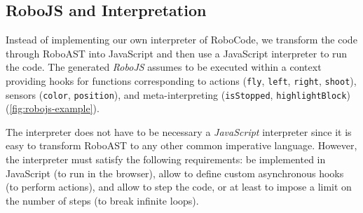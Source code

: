 
\subsection{RoboJS and Interpretation}
\label{sec:robomission-robojs}

Instead of implementing our own interpreter of RoboCode,
we transform the code through RoboAST into JavaScript
and then use a JavaScript interpreter to run the code.
The generated \emph{RoboJS} %
assumes to be executed within a
context providing hooks for functions corresponding to actions (\texttt{fly}, \texttt{left}, \texttt{right}, \texttt{shoot}),
sensors (\texttt{color}, \texttt{position}),
and meta-interpreting (\texttt{isStopped}, \texttt{highlightBlock})
(\cref{fig:robojs-example}).

The interpreter does not have to be necessary a \emph{JavaScript} interpreter
since it is easy to transform RoboAST to any other common imperative language.
However, the interpreter must satisfy the following requirements:
be implemented in JavaScript (to run in the browser),
allow to define custom asynchronous hooks
(to perform actions),
and allow to step the code, or at least to impose a limit on
the number of steps %
(to break infinite loops).




